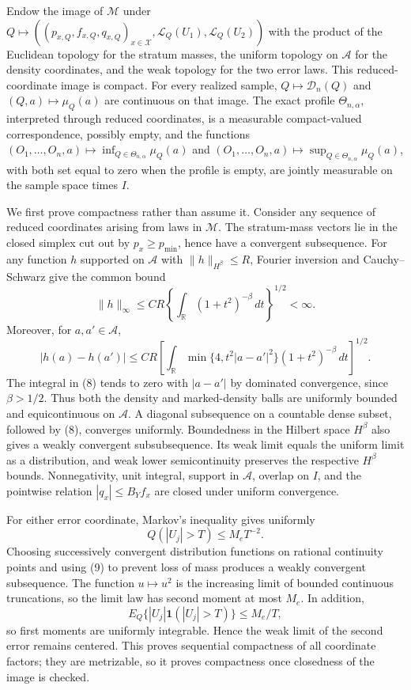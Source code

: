 Endow the image of \(\mathcal M\) under \(Q\mapsto((p_{x,Q},f_{x,Q},q_{x,Q})_{x\in\mathcal X},\mathcal L_Q(U_1),\mathcal L_Q(U_2))\) with the product of the Euclidean topology for the stratum masses, the uniform topology on \(\mathcal A\) for the density coordinates, and the weak topology for the two error laws.  This reduced-coordinate image is compact.  For every realized sample, \(Q\mapsto\mathscr D_n(Q)\) and \((Q,a)\mapsto\mu_Q(a)\) are continuous on that image.  The exact profile \(\Theta_{n,\alpha}\), interpreted through reduced coordinates, is a measurable compact-valued correspondence, possibly empty, and the functions \((O_1,\ldots,O_n,a)\mapsto\inf_{Q\in\Theta_{n,\alpha}}\mu_Q(a)\) and \((O_1,\ldots,O_n,a)\mapsto\sup_{Q\in\Theta_{n,\alpha}}\mu_Q(a)\), with both set equal to zero when the profile is empty, are jointly measurable on the sample space times \(I\).

We first prove compactness rather than assume it.  Consider any sequence of reduced coordinates arising from laws in \(\mathcal M\).  The stratum-mass vectors lie in the closed simplex cut out by \(p_x\ge p_{\min}\), hence have a convergent subsequence.  For any function \(h\) supported on \(\mathcal A\) with \(\|h\|_{H^\beta}\le R\), Fourier inversion and Cauchy--Schwarz give the common bound
\[
\|h\|_\infty
\le C R\left\{\int_{\mathbb R}(1+t^2)^{-\beta}\,dt\right\}^{1/2}<\infty. \tag{7}
\]
Moreover, for \(a,a'\in\mathcal A\),
\[
|h(a)-h(a')|
\le CR\left[\int_{\mathbb R}
\min\{4,t^2|a-a'|^2\}(1+t^2)^{-\beta}\,dt\right]^{1/2}. \tag{8}
\]
The integral in (8) tends to zero with \(|a-a'|\) by dominated convergence, since \(\beta>1/2\).  Thus both the density and marked-density balls are uniformly bounded and equicontinuous on \(\mathcal A\).  A diagonal subsequence on a countable dense subset, followed by (8), converges uniformly.  Boundedness in the Hilbert space \(H^\beta\) also gives a weakly convergent subsubsequence.  Its weak limit equals the uniform limit as a distribution, and weak lower semicontinuity preserves the respective \(H^\beta\) bounds.  Nonnegativity, unit integral, support in \(\mathcal A\), overlap on \(I\), and the pointwise relation \(|q_x|\le B_Yf_x\) are closed under uniform convergence.

For either error coordinate, Markov's inequality gives uniformly
\[
Q(|U_j|>T)\le M_eT^{-2}. \tag{9}
\]
Choosing successively convergent distribution functions on rational continuity points and using (9) to prevent loss of mass produces a weakly convergent subsequence.  The function \(u\mapsto u^2\) is the increasing limit of bounded continuous truncations, so the limit law has second moment at most \(M_e\).  In addition,
\[
E_Q\{|U_j|\mathbf 1(|U_j|>T)\}\le M_e/T, \tag{10}
\]
so first moments are uniformly integrable.  Hence the weak limit of the second error remains centered.  This proves sequential compactness of all coordinate factors; they are metrizable, so it proves compactness once closedness of the image is checked.

